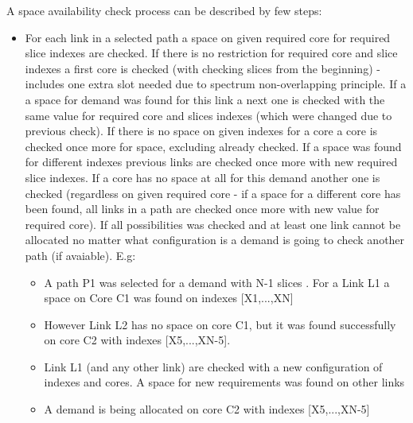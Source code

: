 \documentclass[conference]{IEEEtran}
\begin{document}
A space availability check process can be described by few steps:
\begin{itemize}
\item For each link in a selected path a space on given required core for required slice indexes are checked. If there is no restriction for required core and slice indexes a first core is checked (with checking slices from the beginning) - includes one extra slot needed due to spectrum non-overlapping principle. If a a space for demand was found for this link a next one is checked with the same value for required core and slices indexes (which were changed due to previous check). If there is no space on given indexes for a core a core is checked once more for space, excluding already checked. If a space was found for different indexes previous links are checked once more with new required slice indexes. If a core has no space at all for this demand another one is checked (regardless on given required core - if a space for a different core has been found, all links in a path are checked once more with new value for required core). If all possibilities was checked and at least one link cannot be allocated no matter what configuration is a demand is going to check another path (if avaiable). E.g:
  \begin{itemize}
  \item A path P1 was selected for a demand with N-1 slices . For a Link L1 a space on Core C1 was found on indexes [X1,...,XN]
  \item However Link L2 has no space on core C1, but it was found successfully on core C2 with indexes [X5,...,XN-5].
  \item Link L1 (and any other link) are checked with a new configuration of indexes and cores. A space for new requirements was found on other links
  \item A demand is being allocated on core C2 with indexes [X5,...,XN-5]
  \end{itemize}
\end{itemize}
\end{document}
